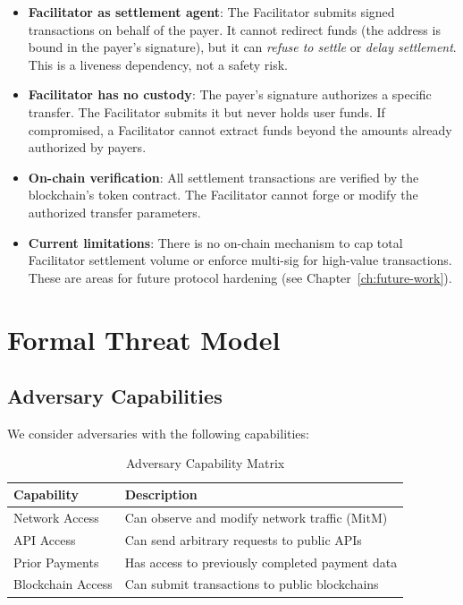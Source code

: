 \begin{itemize}
    \item \textbf{Facilitator as settlement agent}: The Facilitator submits signed transactions on behalf of the payer. It cannot redirect funds (the  address is bound in the payer's signature), but it can \emph{refuse to settle} or \emph{delay settlement}. This is a liveness dependency, not a safety risk.

    \item \textbf{Facilitator has no custody}: The payer's signature authorizes a specific transfer. The Facilitator submits it but never holds user funds. If compromised, a Facilitator cannot extract funds beyond the amounts already authorized by payers.

    \item \textbf{On-chain verification}: All settlement transactions are verified by the blockchain's token contract. The Facilitator cannot forge or modify the authorized transfer parameters.

    \item \textbf{Current limitations}: There is no on-chain mechanism to cap total Facilitator settlement volume or enforce multi-sig for high-value transactions. These are areas for future protocol hardening (see Chapter~\ref{ch:future-work}).
\end{itemize}

\section{Formal Threat Model}
\label{sec:threat-model-formal}

\subsection{Adversary Capabilities}

We consider adversaries with the following capabilities:

\begin{table}[htbp]
\centering
\caption{Adversary Capability Matrix}
\label{tab:adversary-capabilities}
\begin{tabular}{lp{8cm}}
\toprule
\textbf{Capability} & \textbf{Description} \\
\midrule
Network Access & Can observe and modify network traffic (MitM) \\
API Access & Can send arbitrary requests to public APIs \\
Prior Payments & Has access to previously completed payment data \\
Blockchain Access & Can submit transactions to public blockchains \\
\bottomrule
\end{tabular}
\end{table}

